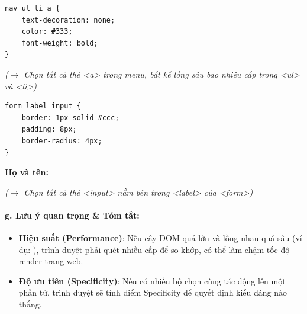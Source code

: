 \begin{codeWindow}
\begin{lstlisting}[language=CSS3]
nav ul li a {
    text-decoration: none;
    color: #333;
    font-weight: bold;
}
\end{lstlisting}
\end{codeWindow}

\begin{browserWindow}
\sffamily\small
\tcbox[on line, arc=3pt, colback=gray!15, colframe=gray!40, boxrule=1pt, boxsep=4pt, left=8pt, right=8pt]{\textcolor{darkText}{\bfseries Trang chủ}} \quad
\tcbox[on line, arc=3pt, colback=gray!15, colframe=gray!40, boxrule=1pt, boxsep=4pt, left=8pt, right=8pt]{\textcolor{darkText}{\bfseries Khóa học $\downarrow$}} \par\vspace{4pt}
\textcolor{gray!70}{\small\textit{($\rightarrow$ Chọn tất cả thẻ <a> trong menu, bất kể lồng sâu bao nhiêu cấp trong <ul> và <li>)}}
\end{browserWindow}

\begin{codeWindow}
\begin{lstlisting}[language=CSS3]
form label input {
    border: 1px solid #ccc;
    padding: 8px;
    border-radius: 4px;
}
\end{lstlisting}
\end{codeWindow}

\begin{browserWindow}
\sffamily\small
\textbf{Họ và tên:} \tcbox[on line, arc=3pt, colback=white, colframe=gray!40, boxrule=1pt, boxsep=3pt, left=8pt, right=20pt]{\textcolor{gray!60}{Nhập họ tên...}} \par\vspace{4pt}
\textcolor{gray!70}{\small\textit{($\rightarrow$ Chọn tất cả thẻ <input> nằm bên trong <label> của <form>)}}
\end{browserWindow}

\paragraph{g. Lưu ý quan trọng \& Tóm tắt:}

\begin{warnBox}
\begin{itemize}[leftmargin=1.5em, itemsep=3pt, parsep=0pt]
    \item \textbf{Hiệu suất (Performance)}: Nếu cây DOM quá lớn và lồng nhau quá sâu (ví dụ: ), trình duyệt phải quét nhiều cấp để so khớp, có thể làm chậm tốc độ render trang web.
    \item \textbf{Độ ưu tiên (Specificity)}: Nếu có nhiều bộ chọn cùng tác động lên một phần tử, trình duyệt sẽ tính điểm Specificity để quyết định kiểu dáng nào thắng.
\end{itemize}
\end{warnBox}

